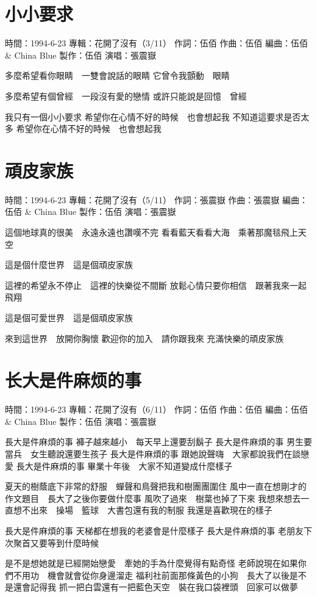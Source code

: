 \documentclass[UTF8,a4paper,oneside,twocolumn,12pt]{ctexbook}
\newcommand{\infopair}[2]{\textbullet #1：#2}
\newcommand{\zc}[1][伍佰]{\infopair{作詞}{#1}}
\newcommand{\zq}[1][伍佰]{\infopair{作曲}{#1}}
\newcommand{\bq}[1][伍佰]{\infopair{編曲}{#1}}
\newcommand{\zj}[1]{\infopair{專輯}{#1}}
\newcommand{\zz}[1]{\infopair{製作}{#1}}
\newcommand{\sj}[1]{\infopair{時間}{#1}}
\newenvironment{info}{\begin{flushleft}\kaishu
	}
	{\end{flushleft}\normalsize\yahei\par}
\newenvironment{lyric}{
	}
{}
\begin{document}
\section{小小要求}
\begin{info}
	\sj{1994-6-23}
	\zj{花開了沒有（3/11）}
	\zc
	\zq
	\bq[伍佰 \& China Blue]
	\zz{伍佰}
	\infopair{演唱}{張震嶽}
\end{info}
\begin{lyric}
	多麼希望看你眼睛　一雙會說話的眼睛
	它曾令我顫動　眼睛

	多麼希望有個曾經　一段沒有愛的戀情
	或許只能說是回憶　曾經

	我只有一個小小要求
	希望你在心情不好的時候　也會想起我
	不知道這要求是否太多
	希望你在心情不好的時候　也會想起我
\end{lyric}

\section{頑皮家族}
\begin{info}
	\sj{1994-6-23}
	\zj{花開了沒有（5/11）}
	\zc[張震嶽]
	\zq[張震嶽]
	\bq[伍佰 \& China Blue]
	\zz{伍佰}
	\infopair{演唱}{張震嶽}
\end{info}
\begin{lyric}
	這個地球真的很美　永遠永遠也讚嘆不完
	看看藍天看看大海　乘著那魔毯飛上天空

	這是個什麼世界　這是個頑皮家族

	這裡的希望永不停止　這裡的快樂從不間斷
	放鬆心情只要你相信　跟著我來一起飛翔

	這是個可愛世界　這是個頑皮家族

	來到這世界　放開你胸懷
	歡迎你的加入　請你跟我來
	充滿快樂的頑皮家族
\end{lyric}

\section{长大是件麻烦的事}
\begin{info}
	\sj{1994-6-23}
	\zj{花開了沒有（6/11）}
	\zc
	\zq
	\bq[伍佰 \& China Blue]
	\zz{伍佰}
	\infopair{演唱}{張震嶽}
\end{info}
\begin{lyric}
	長大是件麻煩的事
	褲子越來越小　每天早上還要刮鬍子
	長大是件麻煩的事
	男生要當兵　女生聽說還要生孩子
	長大是件麻煩的事
	跟她說聲嗨　大家都說我們在談戀愛
	長大是件麻煩的事
	畢業十年後　大家不知道變成什麼樣子

	夏天的樹蔭底下非常的舒服　蟬聲和鳥聲把我和樹團團圍住
	風中一直在想剛才的作文題目　長大了之後你要做什麼事
	風吹了過來　樹葉也掉了下來
	我想來想去一直想不出來　操場　籃球　大書包還有我的制服
	我還是喜歡現在的樣子

	長大是件麻煩的事
	天梯都在想我的老婆會是什麼樣子
	長大是件麻煩的事
	老朋友下次聚首又要等到什麼時候

	是不是想她就是已經開始戀愛　牽她的手為什麼覺得有點奇怪
	老師說現在如果你們不用功　機會就會從你身邊溜走
	福利社前面那條黃色的小狗　長大了以後是不是還會記得我
	抓一把白雲還有一把藍色天空　裝在我口袋裡頭　回家可以做夢
\end{lyric}
\end{document}
